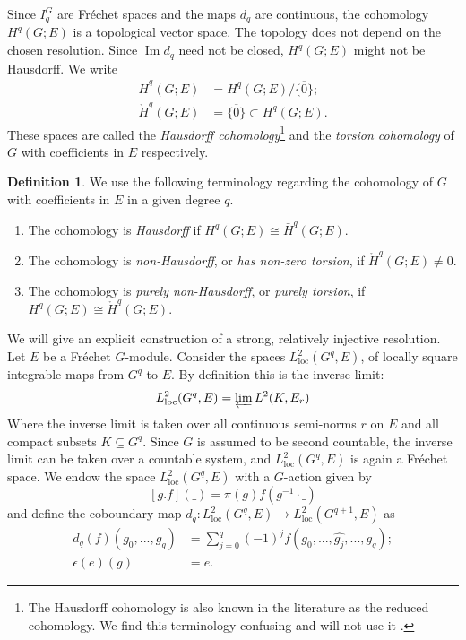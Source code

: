 \documentclass[12pt,reqno]{amsart}
\theoremstyle{definition}
\newtheorem{definition}[theorem]{Definition}
\newcommand{\torH}{\mathring{H}}
\begin{document}
Since $I_q^G$ are Fr\'echet spaces and the maps $d_q$ are continuous, the cohomology $H^q(G;E)$ is a topological vector space. The topology does not depend on the chosen resolution. Since $\operatorname{Im} d_q$ need not be closed, $H^q(G;E)$ might not be Hausdorff. We write  
\begin{align*}
\bar{H}^q(G;E) &= H^q(G;E)/\overline{\{0\}};\\
\torH^q(G;E) &= \overline{\{0\}}\subset H^q(G;E).
\end{align*} These spaces are called the \emph{Hausdorff cohomology}\footnote{
The Hausdorff cohomology is also known in the literature as the reduced cohomology. We find this terminology confusing and will not use it
.} and the \emph{torsion cohomology} of $G$ with coefficients in $E$ respectively.
\begin{definition}
    We use the following terminology regarding the cohomology of $G$ with coefficients in $E$ in a given degree $q$.
    \begin{enumerate}
        \item The cohomology is \emph{Hausdorff} if $H^q(G;E) \cong \bar{H}^q(G;E)$.
        \item The cohomology is \emph{non-Hausdorff}, or \emph{has non-zero torsion}, if $\torH^q(G;E) \ne 0$.
        \item The cohomology is \emph{purely non-Hausdorff}, or \emph{purely torsion}, if $H^q(G;E) \cong \torH^q(G;E)$.
    \end{enumerate}
\end{definition}
We will give an explicit construction of a strong, relatively injective resolution. Let $E$ be a Fr\'echet $G$-module. Consider the spaces $L^2_\mathrm{loc}(G^q,E)$, of locally square integrable maps from $G^q$ to $E$. By definition this is the inverse limit:
$$L^2_\mathrm{loc}(G^q,E) = \varprojlim L^2(K,E_r)$$
Where the inverse limit is taken over all continuous semi-norms $r$ on $E$ and all compact subsets $K \subseteq G^q$. Since $G$ is assumed to be second countable, the inverse limit can be taken over a countable system, and $L^2_\mathrm{loc}(G^q,E)$ is again a Fr\'echet space. We endow the space $L^2_\mathrm{loc}(G^q,E)$ with a $G$-action given by
\[[g.f](\_) = \pi(g)f(g^{-1}\cdot\_)\]
and define the coboundary map $d_q\colon L^2_{\mathrm{loc}}(G^{q},E) \rightarrow L^2_{\mathrm{loc}}(G^{q+1},E)$ as
\begin{align*}d_q(f)(g_0,...,g_q) &= \sum_{j=0}^{q}(-1)^jf(g_0,...,\hat{g_j},...,g_q);\\
\epsilon(e)(g) &= e.
\end{align*}
\end{document}

